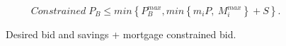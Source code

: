 \begin{equation}
    Constrained\; P_{B} \le min \left\{P^{max}_B, min\left\{m_i P,\  M_{i}^{max}\right\}+ S \right\}.  \label{eqn:bid_diagonal}
\end{equation}




 \begin{figure}
    \centering
    
    \caption[Desired bid and savings + mortgage constrained bid]{Desired bid and savings + mortgage constrained bid.}
    \label{fig:savings-constraint}
    \end{figure}

%



        

